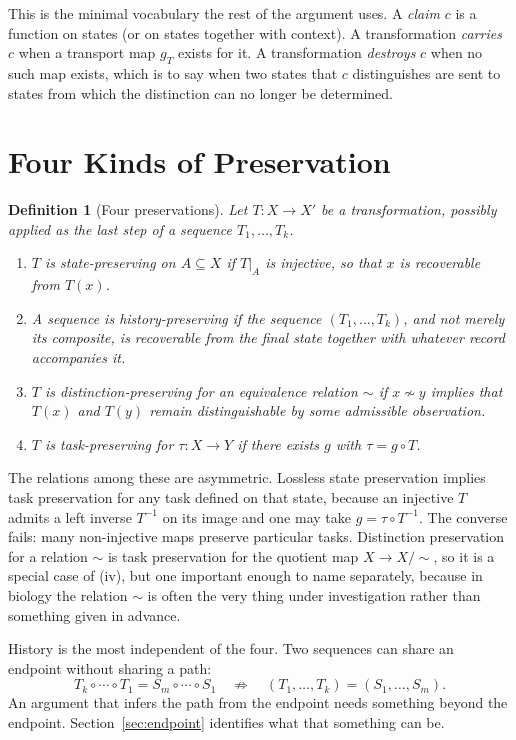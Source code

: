 \documentclass[11pt]{article}
\newtheorem{definition}{Definition}
\theoremstyle{remark}
\begin{document}
This is the minimal vocabulary the rest of the argument uses. A \emph{claim} $c$ is a function on states (or on states together with context). A transformation \emph{carries} $c$ when a transport map $g_T$ exists for it. A transformation \emph{destroys} $c$ when no such map exists, which is to say when two states that $c$ distinguishes are sent to states from which the distinction can no longer be determined.

\section{Four Kinds of Preservation}

\begin{definition}[Four preservations]
Let $T:X\to X'$ be a transformation, possibly applied as the last step of a sequence $T_1,\dots,T_k$.
\begin{enumerate}[label=(\roman*)]
\item $T$ is \emph{state-preserving} on $A\subseteq X$ if $T|_A$ is injective, so that $x$ is recoverable from $T(x)$.
\item A sequence is \emph{history-preserving} if the sequence $(T_1,\dots,T_k)$, and not merely its composite, is recoverable from the final state together with whatever record accompanies it.
\item $T$ is \emph{distinction-preserving} for an equivalence relation $\sim$ if $x\not\sim y$ implies that $T(x)$ and $T(y)$ remain distinguishable by some admissible observation.
\item $T$ is \emph{task-preserving} for $\tau:X\to Y$ if there exists $g$ with $\tau = g\circ T$.
\end{enumerate}
\end{definition}

The relations among these are asymmetric. Lossless state preservation implies task preservation for any task defined on that state, because an injective $T$ admits a left inverse $T^{-1}$ on its image and one may take $g=\tau\circ T^{-1}$. The converse fails: many non-injective maps preserve particular tasks. Distinction preservation for a relation $\sim$ is task preservation for the quotient map $X\to X/{\sim}$, so it is a special case of (iv), but one important enough to name separately, because in biology the relation $\sim$ is often the very thing under investigation rather than something given in advance.

History is the most independent of the four. Two sequences can share an endpoint without sharing a path:
\[
T_k\circ\cdots\circ T_1 = S_m\circ\cdots\circ S_1
\quad\not\Rightarrow\quad
(T_1,\dots,T_k)=(S_1,\dots,S_m).
\]
An argument that infers the path from the endpoint needs something beyond the endpoint. Section~\ref{sec:endpoint} identifies what that something can be.
\end{document}
